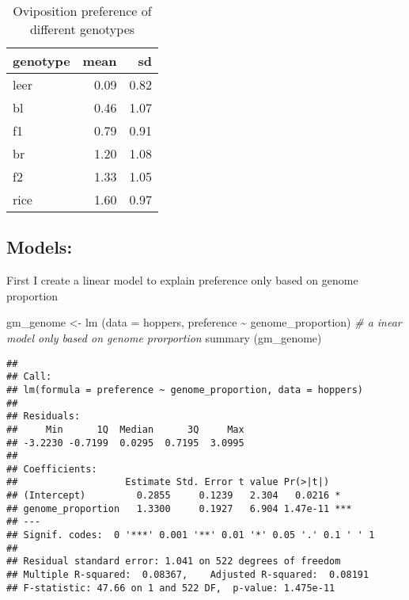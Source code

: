 \documentclass[
]{article}
\newenvironment{Shaded}{\begin{snugshade}}{\end{snugshade}}
\newcommand{\AttributeTok}[1]{\textcolor[rgb]{0.77,0.63,0.00}{#1}}
\newcommand{\CommentTok}[1]{\textcolor[rgb]{0.56,0.35,0.01}{\textit{#1}}}
\newcommand{\FunctionTok}[1]{\textcolor[rgb]{0.00,0.00,0.00}{#1}}
\newcommand{\NormalTok}[1]{#1}
\newcommand{\OtherTok}[1]{\textcolor[rgb]{0.56,0.35,0.01}{#1}}
\newcommand{\SpecialCharTok}[1]{\textcolor[rgb]{0.00,0.00,0.00}{#1}}
\begin{document}
\begin{table}

\caption{\label{tab:unnamed-chunk-3}Oviposition preference of different genotypes}
\centering
\begin{tabular}[t]{l|r|r}
\hline
genotype & mean & sd\\
\hline
leer & 0.09 & 0.82\\
\hline
bl & 0.46 & 1.07\\
\hline
f1 & 0.79 & 0.91\\
\hline
br & 1.20 & 1.08\\
\hline
f2 & 1.33 & 1.05\\
\hline
rice & 1.60 & 0.97\\
\hline
\end{tabular}
\end{table}

\hypertarget{models}{%
\subsection{Models:}\label{models}}

First I create a linear model to explain preference only based on genome
proportion

\begin{Shaded}
\begin{Highlighting}[]
\NormalTok{gm\_genome }\OtherTok{\textless{}{-}} \FunctionTok{lm}\NormalTok{ (}\AttributeTok{data =}\NormalTok{ hoppers, preference }\SpecialCharTok{\textasciitilde{}}\NormalTok{ genome\_proportion) }\CommentTok{\# a inear model only based on genome prorportion}
\FunctionTok{summary}\NormalTok{ (gm\_genome) }
\end{Highlighting}
\end{Shaded}

\begin{verbatim}
## 
## Call:
## lm(formula = preference ~ genome_proportion, data = hoppers)
## 
## Residuals:
##     Min      1Q  Median      3Q     Max 
## -3.2230 -0.7199  0.0295  0.7195  3.0995 
## 
## Coefficients:
##                   Estimate Std. Error t value Pr(>|t|)    
## (Intercept)         0.2855     0.1239   2.304   0.0216 *  
## genome_proportion   1.3300     0.1927   6.904 1.47e-11 ***
## ---
## Signif. codes:  0 '***' 0.001 '**' 0.01 '*' 0.05 '.' 0.1 ' ' 1
## 
## Residual standard error: 1.041 on 522 degrees of freedom
## Multiple R-squared:  0.08367,    Adjusted R-squared:  0.08191 
## F-statistic: 47.66 on 1 and 522 DF,  p-value: 1.475e-11
\end{verbatim}
\end{document}

